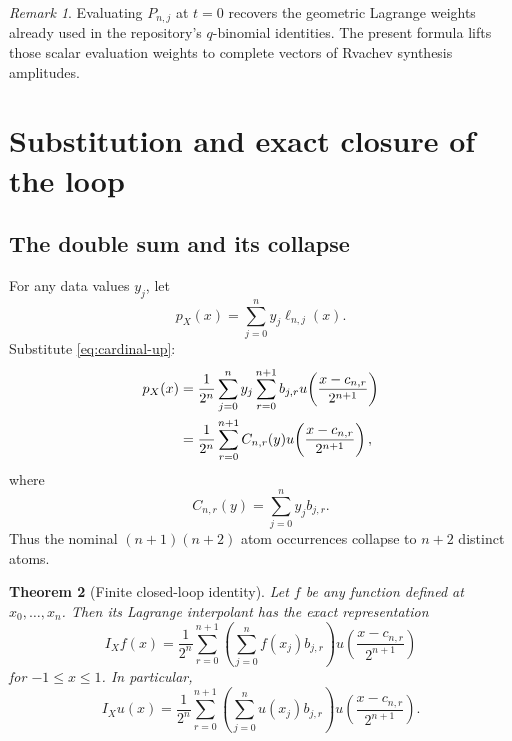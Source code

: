 \documentclass[11pt,oneside]{article}
\newtheorem{theorem}{Theorem}[section]
\theoremstyle{definition}
\theoremstyle{remark}
\newtheorem{remark}[theorem]{Remark}
\newcommand{\1}{\mathbf{1}}
\begin{document}
\begin{remark}
Evaluating $P_{n,j}$ at $t=0$ recovers the geometric Lagrange weights already
used in the repository's $q$-binomial identities.  The present formula lifts
those scalar evaluation weights to complete vectors of Rvachev synthesis
amplitudes.
\end{remark}

\section{Substitution and exact closure of the loop}
\label{sec:loop}

\subsection{The double sum and its collapse}

For any data values $y_j$, let
\begin{equation}
 p_X(x)=\sum_{j=0}^ny_j\ell_{n,j}(x).
 \label{eq:pX}
\end{equation}
Substitute \eqref{eq:cardinal-up}:
\begin{align}
 p_X(x)
 &=\frac1{2^n}\sum_{j=0}^ny_j\sum_{r=0}^{n+1}b_{j,r}
 u\!\left(\frac{x-c_{n,r}}{2^{n+1}}\right)\notag\\
 &=\frac1{2^n}\sum_{r=0}^{n+1}C_{n,r}(y)
 u\!\left(\frac{x-c_{n,r}}{2^{n+1}}\right),
 \label{eq:collapsed-loop}
\end{align}
where
\begin{equation}
 C_{n,r}(y)=\sum_{j=0}^ny_jb_{j,r}.
 \label{eq:C}
\end{equation}
Thus the nominal $(n+1)(n+2)$ atom occurrences collapse to $n+2$ distinct
atoms.

\begin{theorem}[Finite closed-loop identity]
\label{thm:finite-loop}
Let $f$ be any function defined at $x_0,\ldots,x_n$.  Then its Lagrange
interpolant has the exact representation
\begin{equation}
 \boxed{
 I_Xf(x)=\frac1{2^n}\sum_{r=0}^{n+1}
 \left(\sum_{j=0}^nf(x_j)b_{j,r}\right)
 u\!\left(\frac{x-c_{n,r}}{2^{n+1}}\right)}
 \label{eq:loop-f}
\end{equation}
for $-1\le x\le1$.  In particular,
\begin{equation}
 I_Xu(x)=\frac1{2^n}\sum_{r=0}^{n+1}
 \left(\sum_{j=0}^nu(x_j)b_{j,r}\right)
 u\!\left(\frac{x-c_{n,r}}{2^{n+1}}\right).
 \label{eq:loop-u}
\end{equation}
\end{theorem}
\end{document}
